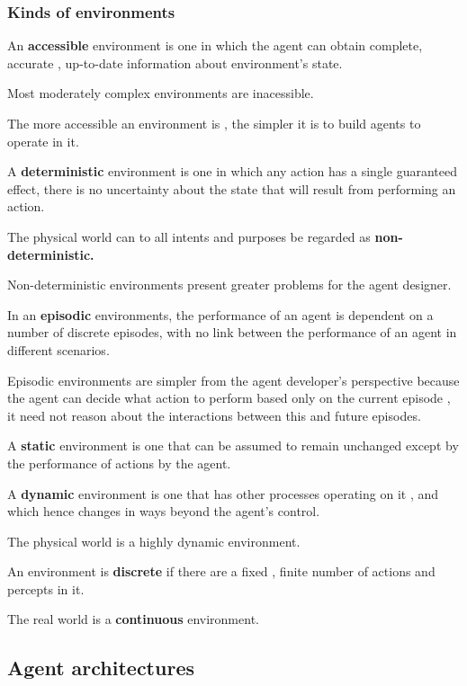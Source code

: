 \documentclass{article}
\begin{document}
\subsubsection{Kinds of environments}

An \textbf{accessible} environment is one in which the agent can obtain complete, accurate , up-to-date information about environment's state.

Most moderately complex environments are inacessible.

The more accessible an environment is , the simpler it is to build agents to operate in it.

A \textbf{deterministic} environment is one in which any action has a single guaranteed effect, there is no uncertainty about the state that will result from performing an action.

The physical world can to all intents and purposes be regarded as \textbf{non-deterministic.}

Non-deterministic environments present greater problems for the agent designer.

In an \textbf{episodic} environments, the performance of an agent is dependent on a number of discrete episodes, with no link between the performance of an agent in different scenarios.

Episodic environments are simpler from the agent developer's perspective because the agent can decide what action to perform based only on the current episode , it need not reason about the interactions between this and future episodes.


A \textbf{static} environment is one that can be assumed to remain unchanged except by the performance of actions by the agent.

A \textbf{dynamic} environment is one that has other processes operating on it , and which hence changes in ways beyond the agent's control.

The physical world is a highly dynamic environment.

An environment is \textbf{discrete} if there are a fixed , finite number of actions and percepts in it.

The real world is a \textbf{continuous} environment.













\subsection{Agent architectures}
\end{document}
